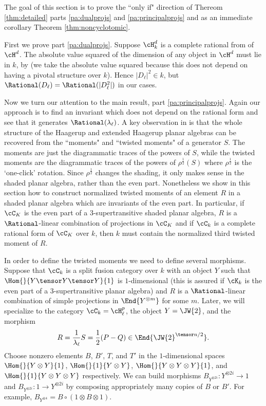 
The goal of this section is to prove the ``only if" direction of Thereom \ref{thm:detailed} parts \ref{pa:dualprojs} and \ref{pa:principalprojs} and as an immediate corollary Theorem \ref{thm:noncyclotomic}.

First we prove part \ref{pa:dualprojs}.  Suppose $\cH_k^d$ is a complete rational from of $\cH^d$.  The absolute value squared of the dimension of any object in $\cH^d$ must lie in $k$, by \cite[\S 2.1]{MR2183279} (we take the absolute value squared because this does not depend on having a pivotal structure over $k$).  Hence $|D_\ell |^2 \in k$, but $\Rational(D_\ell) = \Rational(|D_\ell^2|)$ in our cases.

Now we turn our attention to the main result, part \ref{pa:principalprojs}.  Again our approach is to find an invariant which does not depend on the rational form and see that it generates $\Rational(\lambda_\ell)$.  A key observation in \cite{0902.1294, 0909.4099} is that the whole structure of the Haagerup and extended Haagerup planar algebras can be recovered from the ``moments" and ``twisted moments" of a generator $S$.  The moments are just the diagrammatic traces of the powers of $S$, while the twisted moments are the diagrammatic traces of the powers of $\rho^{\frac{1}{2}}(S)$ where $\rho^{\frac{1}{2}}$ is the `one-click' rotation.  Since $\rho^{\frac{1}{2}}$ changes the shading, it only makes sense in the shaded planar algebra, rather than the even part.  Nonetheless we show in this section how to construct normalized twisted moments of an element $R$ in a shaded planar algebra which are invariants of the even part.  In particular, if $\cC_K$ is the even part of a $3$-supertransitive shaded planar algebra, $R$ is a $\Rational$-linear combination of projections in $\cC_K$ and if $\cC_k$ is a complete rational form of $\cC_K$ over $k$, then $k$ must contain the normalized third twisted moment of $R$.

In order to define the twisted moments  we need to define several morphisms.  Suppose that $\cC_k$ is a split fusion category over $k$ with an object $Y$ such that $\Hom{}{Y\tensor Y \tensor Y}{1}$ is $1$-dimensional (this is assured if $\cK_k$ is the even part of a 3-supertransitive planar algebra) and $R$ is a $\Rational$-linear combination of simple projections in $\End{Y^{\otimes m}}$ for some $m$.  Later, we will specialize to the category $\cC_k = \cH_\ell^p$, the object $Y=\JW{2}$, and the morphism $$R = \frac{1}{\lambda_\ell} S = \frac{1}{2}(P-Q) \in \End{{\JW{2}}^{\tensor n/2}}.$$  Choose nonzero elements $B$, $B'$, $T$, and $T'$ in the $1$-dimensional spaces $\Hom{}{Y \otimes Y}{1}$, $\Hom{}{1}{Y \otimes Y}$, $\Hom{}{Y \otimes Y \otimes Y}{1}$, and $\Hom{}{1}{Y \otimes Y \otimes Y}$ respectively.  We can build morphisms $B_{Y^{\otimes 2i}}: Y^{\otimes 2i} \rightarrow 1$ and $B_{Y^{\otimes 2i}}: 1 \rightarrow Y^{\otimes 2i}$  by composing appropriately many copies of $B$ or $B'$.  For example, $B_{Y^{\otimes 4}} =  B \circ (1 \otimes B \otimes 1)$.

